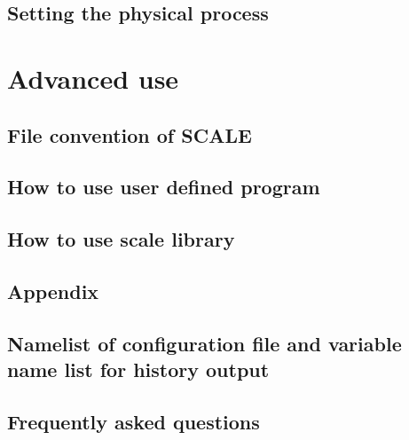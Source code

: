 \documentclass[a4paper]{report}
\begin{document}
 \chapter{Setting the physical process} \label{sec:basic_usel_physics}

\part{Advanced use} \label{part:advance_use}
 \chapter{File convention of SCALE}
 \chapter{How to use user defined program}
 \chapter{How to use scale library}





\begin{appendix}
\part{Appendix}
\chapter{Namelist of configuration file and variable name list for history output} \label{achap:namelist}

\chapter{Frequently asked questions} \label{achap:practice}


\end{appendix}


\ClearWallPaper

\end{document}
